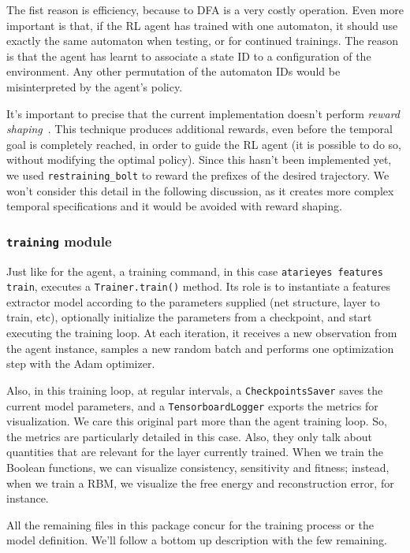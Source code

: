 The fist reason is efficiency, because \ldl{} to DFA is a very costly
operation. Even more important is that, if the RL agent has trained with one
automaton, it should use exactly the same automaton when testing, or for
continued trainings. The reason is that the agent has learnt to associate a
state ID to a configuration of the environment. Any other permutation of the
automaton IDs would be misinterpreted by the agent's policy.

It's important to precise that the current implementation doesn't perform
\emph{reward shaping}~\cite{bib:favorito-thesis}. This technique produces
additional rewards, even before the temporal goal is completely reached, in
order to guide the RL agent (it is possible to do so, without modifying the
optimal policy). Since this hasn't been implemented yet, we used
\texttt{restraining\_bolt} to reward the prefixes of the desired trajectory.
We won't consider this detail in the following discussion, as it creates more
complex temporal specifications and it would be avoided with reward shaping.


\subsubsection*{\texttt{training} module}

Just like for the agent, a training command, in this case
\verb|atarieyes features train|, executes a \verb|Trainer.train()| method.
Its role is to instantiate a features extractor model according to the
parameters supplied (net structure, layer to train, etc), optionally
initialize the parameters from a checkpoint, and start executing the training
loop.  At each iteration, it receives a new observation from the agent
instance, samples a new random batch and performs one optimization step with
the Adam optimizer.

Also, in this training loop, at regular intervals, a \texttt{CheckpointsSaver}
saves the current model parameters, and a \texttt{TensorboardLogger} exports
the metrics for visualization. We care this original part more than the agent
training loop. So, the metrics are particularly detailed in this case. Also,
they only talk about quantities that are relevant for the layer currently
trained. When we train the Boolean functions, we can visualize consistency,
sensitivity and fitness; instead, when we train a RBM, we visualize the free
energy and reconstruction error, for instance.

All the remaining files in this package concur for the training process or the
model definition. We'll follow a bottom up description with the few remaining.


